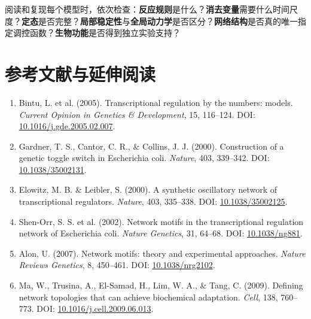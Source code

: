 \documentclass[11pt,a4paper,UTF8]{ctexart}
\begin{document}
\noindent 阅读和复现每个模型时，依次检查：\textbf{反应规则}是什么？\textbf{消去变量}需要什么时间尺度？\textbf{定态}是否完整？\textbf{局部稳定性}与\textbf{全局动力学}是否区分？\textbf{网络结构}是否真的唯一指定调控函数？\textbf{生物功能}是否得到独立实验支持？

\section*{参考文献与延伸阅读}
\begin{enumerate}[leftmargin=*]
\item Bintu, L. et al. (2005). Transcriptional regulation by the numbers: models. \emph{Current Opinion in Genetics \& Development}, 15, 116--124. DOI: \href{https://doi.org/10.1016/j.gde.2005.02.007}{10.1016/j.gde.2005.02.007}.
\item Gardner, T. S., Cantor, C. R., \& Collins, J. J. (2000). Construction of a genetic toggle switch in Escherichia coli. \emph{Nature}, 403, 339--342. DOI: \href{https://doi.org/10.1038/35002131}{10.1038/35002131}.
\item Elowitz, M. B. \& Leibler, S. (2000). A synthetic oscillatory network of transcriptional regulators. \emph{Nature}, 403, 335--338. DOI: \href{https://doi.org/10.1038/35002125}{10.1038/35002125}.
\item Shen-Orr, S. S. et al. (2002). Network motifs in the transcriptional regulation network of Escherichia coli. \emph{Nature Genetics}, 31, 64--68. DOI: \href{https://doi.org/10.1038/ng881}{10.1038/ng881}.
\item Alon, U. (2007). Network motifs: theory and experimental approaches. \emph{Nature Reviews Genetics}, 8, 450--461. DOI: \href{https://doi.org/10.1038/nrg2102}{10.1038/nrg2102}.
\item Ma, W., Trusina, A., El-Samad, H., Lim, W. A., \& Tang, C. (2009). Defining network topologies that can achieve biochemical adaptation. \emph{Cell}, 138, 760--773. DOI: \href{https://doi.org/10.1016/j.cell.2009.06.013}{10.1016/j.cell.2009.06.013}.
\end{enumerate}
\end{document}
